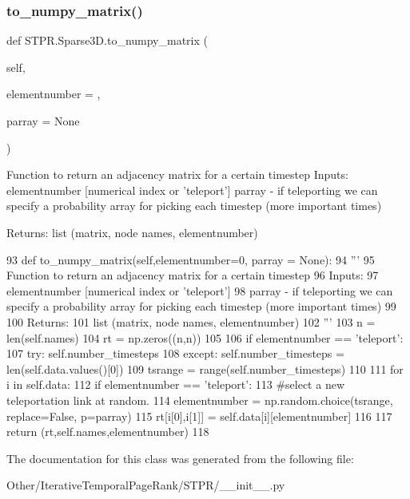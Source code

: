 \subsubsection{\texorpdfstring{to\+\_\+numpy\+\_\+matrix()}{to\_numpy\_matrix()}}
{\footnotesize\ttfamily def S\+T\+P\+R.\+Sparse3\+D.\+to\+\_\+numpy\+\_\+matrix (\begin{DoxyParamCaption}\item[{}]{self,  }\item[{}]{elementnumber = {},  }\item[{}]{parray = {\ttfamily None} }\end{DoxyParamCaption})}

\begin{DoxyVerb}Function to return an adjacency matrix for a certain timestep 
Inputs:
    elementnumber [numerical index or 'teleport']
    parray - if teleporting we can specify a probability array for picking each timestep (more important times)
    
Returns: 
   list (matrix, node names, elementnumber)
\end{DoxyVerb}
 
\begin{DoxyCode}
93       \textcolor{keyword}{def }to\_numpy\_matrix(self,elementnumber=0, parray = None): 
94           \textcolor{stringliteral}{''' }
95 \textcolor{stringliteral}{          Function to return an adjacency matrix for a certain timestep }
96 \textcolor{stringliteral}{          Inputs:}
97 \textcolor{stringliteral}{              elementnumber [numerical index or 'teleport']}
98 \textcolor{stringliteral}{              parray - if teleporting we can specify a probability array for picking each timestep (more
       important times)}
99 \textcolor{stringliteral}{              }
100 \textcolor{stringliteral}{          Returns: }
101 \textcolor{stringliteral}{             list (matrix, node names, elementnumber)}
102 \textcolor{stringliteral}{          '''}
103           n = len(self.names)
104           rt = np.zeros((n,n))
105           
106           \textcolor{keywordflow}{if} elementnumber == \textcolor{stringliteral}{'teleport'}:
107                 \textcolor{keywordflow}{try}: self.number\_timesteps
108                 \textcolor{keywordflow}{except}: self.number\_timesteps = len(self.data.values()[0])
109                 tsrange = range(self.number\_timesteps)
110                         
111           \textcolor{keywordflow}{for} i \textcolor{keywordflow}{in} self.data:
112               \textcolor{keywordflow}{if} elementnumber == \textcolor{stringliteral}{'teleport'}:
113                   \textcolor{comment}{#select a new teleportation link at random. }
114                   elementnumber = np.random.choice(tsrange, replace=\textcolor{keyword}{False}, p=parray)
115               rt[i[0],i[1]] = self.data[i][elementnumber]
116               
117           \textcolor{keywordflow}{return} (rt,self.names,elementnumber)
118             
\end{DoxyCode}


The documentation for this class was generated from the following file\+:\begin{DoxyCompactItemize}
\item 
Other/\+Iterative\+Temporal\+Page\+Rank/\+S\+T\+P\+R/\+\_\+\+\_\+init\+\_\+\+\_\+.\+py\end{DoxyCompactItemize}
